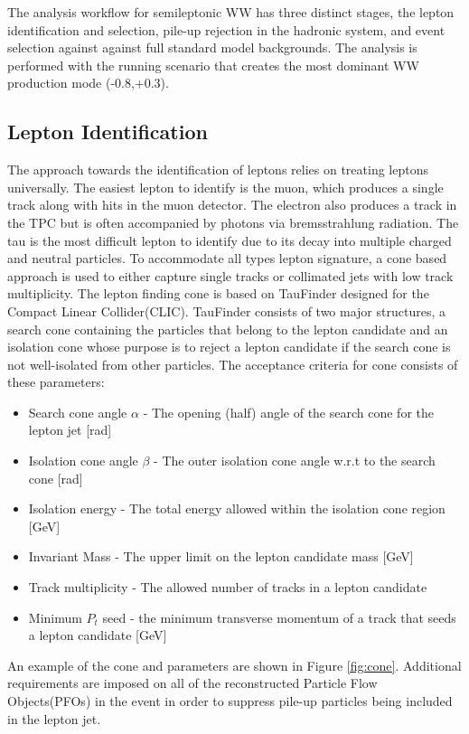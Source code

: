 The analysis workflow for semileptonic WW has three distinct stages, the lepton identification and selection, pile-up rejection in the hadronic system, and event selection against against full standard model backgrounds. The analysis is performed with the  running scenario that creates the most dominant WW production mode (-0.8,+0.3). 


\subsection{Lepton Identification}
\label{subsec:Lepton_ID}
The approach towards the identification of leptons relies on treating leptons universally. The easiest lepton to identify is the muon, which produces a single track along with hits in the muon detector. The electron also produces a track in the TPC but is often accompanied by photons via bremsstrahlung radiation. The tau is the most difficult lepton to identify due to its decay into multiple charged and neutral particles. To accommodate all types lepton signature, a cone based approach is used to either capture single tracks or collimated jets with low track multiplicity. The lepton finding cone is based on TauFinder \cite{taufinder} designed for the Compact Linear Collider(CLIC). TauFinder consists of two major structures, a search cone containing the particles that belong to the lepton candidate and an isolation cone whose purpose is to reject a lepton candidate if the search cone is not well-isolated from other particles. The acceptance criteria for cone consists of these parameters:
\begin{itemize}
\item Search cone angle $\alpha$ - The opening (half) angle of the search cone for the lepton jet [rad]
\item Isolation cone angle $\beta$ - The outer isolation cone angle w.r.t to the search cone [rad]
\item Isolation energy - The total energy allowed within the isolation cone region [GeV]
\item Invariant Mass - The upper limit on the lepton candidate mass [GeV]
\item Track multiplicity - The allowed number of tracks in a lepton candidate
\item Minimum $P_t$ seed - the minimum transverse momentum of a track that seeds a lepton candidate [GeV] 
\end{itemize}
An example of the cone and parameters are shown in Figure \ref{fig:cone}. Additional requirements are imposed on all of the reconstructed Particle Flow Objects(PFOs) in the event in order to suppress pile-up particles being included in the lepton jet.
